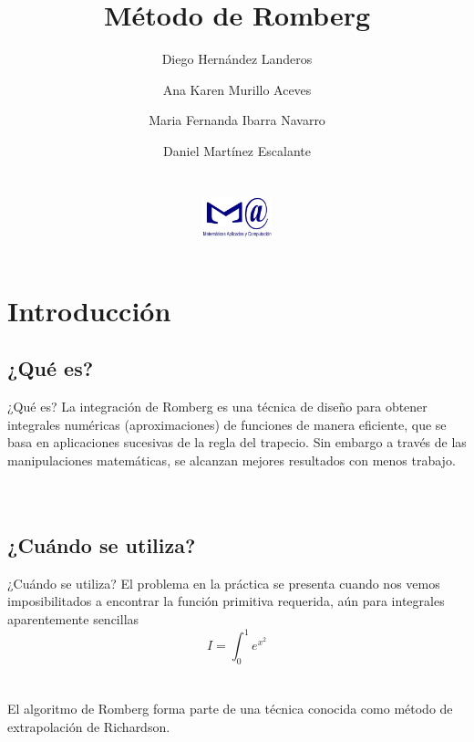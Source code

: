 \documentclass{beamer}
\title[Métodos Numéricos II]
{Método de Romberg}
\author[MAC]{Diego Hernández Landeros\\ \and Ana Karen Murillo Aceves\\\and Maria Fernanda Ibarra Navarro\\\and Daniel Martínez Escalante\\
\\$\,$\\
\centering
\includegraphics[width=2cm]{mac.png}
}
\institute[]{
UNAM-FES Acatlán, Matemáticas Aplicadas y Computación}
\begin{document}
\begin{frame}
  \titlepage
\end{frame}

\section{Introducción}
\subsection{¿Qué es?}

\begin{frame}{¿Qué es?}
La integración de Romberg es una \alert{técnica} de diseño para obtener integrales numéricas \alert{(aproximaciones)} de funciones de manera eficiente, que se basa en aplicaciones sucesivas de \alert{la regla del trapecio}. Sin embargo a través de las manipulaciones matemáticas, se alcanzan mejores resultados con menos trabajo.\\
\\$\,$\\ %

\end{frame}

\subsection{¿Cuándo se utiliza?}
    \begin{frame}{¿Cuándo se utiliza?}
El problema en la práctica se presenta cuando nos vemos imposibilitados a encontrar la
función primitiva requerida, aún para integrales aparentemente sencillas\\
\alert{{\huge \[I=\int_{0}^{1}e^{x^{2}}\]}}
\\$\,$\\
El algoritmo de Romberg forma parte de una técnica conocida como método de extrapolación de Richardson.
\end{frame}

\end{document}
